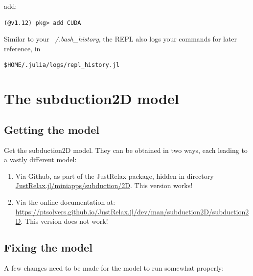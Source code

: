 \documentclass{article}
\begin{document}
add:
\begin{verbatim}
(@v1.12) pkg> add CUDA
\end{verbatim}

Similar to your \textit{~/.bash\_history}, the REPL also logs your commands for later reference, in
\begin{verbatim}
$HOME/.julia/logs/repl_history.jl
\end{verbatim}


\section{The subduction2D model}

\subsection{Getting the model}

Get the subduction2D model. They can be obtained in two ways, each leading to a vastly different model:
\begin{enumerate} 
\item Via Github, as part of the JustRelax package, hidden in directory \url{JustRelax.jl/miniapps/subduction/2D}.
This version works!
\item Via the online documentation at: \url{https://ptsolvers.github.io/JustRelax.jl/dev/man/subduction2D/subduction2D}.
This version does not work!
\end{enumerate}

\subsection{Fixing the model}

A few changes need to be made for the model to run somewhat properly:
\end{document}
